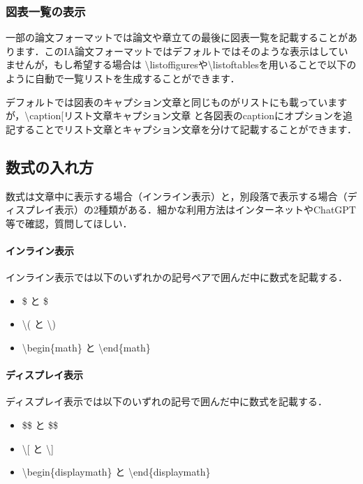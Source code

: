 \documentclass[uplatex,dvipdfmx,a4paper]{jsarticle}
\begin{document}
\subsubsection{図表一覧の表示}
一部の論文フォーマットでは論文や章立ての最後に図表一覧を記載することがあります．このIA論文フォーマットではデフォルトではそのような表示はしていませんが，もし希望する場合は \textbackslash{listoffigures}や\textbackslash{listoftables}を用いることで以下のように自動で一覧リストを生成することができます．

\listoffigures  %
\listoftables   %

デフォルトでは図表のキャプション文章と同じものがリストにも載っていますが，\textbackslash{caption[リスト文章}{キャプション文章} と各図表のcaptionにオプションを追記することでリスト文章とキャプション文章を分けて記載することができます．

\subsection{数式の入れ方}
数式は文章中に表示する場合（インライン表示）と，別段落で表示する場合（ディスプレイ表示）の2種類がある．細かな利用方法はインターネットやChatGPT等で確認，質問してほしい．

\paragraph{インライン表示}
インライン表示では以下のいずれかの記号ペアで囲んだ中に数式を記載する．
\begin{itemize}
    \item \$ と \$
    \item \textbackslash{(} と \textbackslash{)}
    \item \textbackslash begin\{math\} と \textbackslash end\{math\}
\end{itemize}


\paragraph{ディスプレイ表示}
ディスプレイ表示では以下のいずれの記号で囲んだ中に数式を記載する．
\begin{itemize}
    \item \$\$ と \$\$
    \item \textbackslash{[} と \textbackslash{]}
    \item \textbackslash begin\{displaymath\} と \textbackslash end\{displaymath\}
\end{itemize}
\end{document}
